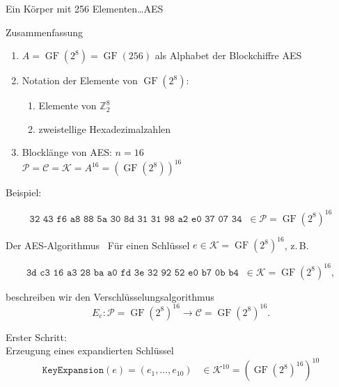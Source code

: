 \documentclass{beamer}
\newcommand{\mc}{\mathcal}
\newcommand{\Z}{\mathbb{Z}}
\newcommand{\expand}{\texttt{KeyExpansion}}
\newcommand{\GF}{\operatorname{GF}}
\theoremstyle{plain}
\begin{document}
\begin{frame}{Ein Körper mit 256 Elementen\dots}{AES}
 \begin{block}{Zusammenfassung}
  \begin{enumerate}
   \item $A = \GF(2^8)= \GF(256)$ als Alphabet der Blockchiffre AES
   \item Notation der Elemente von $\GF(2^8)$:
   \begin{enumerate}
   \item Elemente von $\Z_2^8$
   \item zweistellige Hexadezimalzahlen
  \end{enumerate}
  \item Blocklänge von AES: $n = 16$\\
  $\mc P = \mc C = \mc K = A^{16} = (\GF(2^8))^{16}$
  \end{enumerate}
 \end{block}
 \bigskip
 Beispiel:
 \begin{small}
 \[\texttt{32 43 f6 a8 88 5a 30 8d 31 31 98 a2 e0 37 07 34} \; \; \in \mc P = \GF(2^8)^{16}\]
 \end{small}
\end{frame}


\begin{frame}{Der AES-Algorithmus}{\ }
 Für einen Schlüssel $e \in \mc K = \GF(2^8)^{16}$, z.\,B.
 \begin{small}
 \[\texttt{3d c3 16 a3 28 ba a0 fd 3e 32 92 52 e0 b7 0b b4} \; \; \in \mc K = \GF(2^8)^{16},\]
 \end{small}
 beschreiben wir den Verschlüsselungsalgorithmus 
 \[E_e: \mc P = \GF(2^8)^{16} \rightarrow \mc C = \GF(2^8)^{16}.\]
 \bigskip
 \pause
 
 Erster Schritt:\\
 Erzeugung eines expandierten Schlüssel 
 \[\expand(e) = (e_1, \dots, e_{10}) \;\;\; \in  \mc K^{10} = (\GF(2^8)^{16})^{10}\]
\end{frame}
\end{document}

